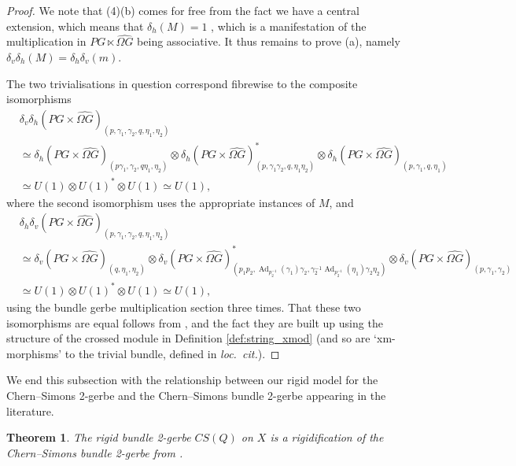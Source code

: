 \documentclass[12pt]{amsart}
\DeclareMathOperator{\Ad}{Ad}
\theoremstyle{plain}
\newtheorem{theorem}{Theorem}[section]
\theoremstyle{definition}
\theoremstyle{remark}
\numberwithin{equation}{section}
\newcommand{\<}{\langle}
\renewcommand{\>}{\rangle}
\begin{document}
\begin{proof}
We note that (4)(b) comes for free from the fact we have a central extension, which means that $\delta_h(M)=1$ \cite[\S 3]{MS03}, which is a manifestation of the multiplication in $PG\ltimes \widehat{\Omega G}$ being associative.
It thus remains to prove (a), namely $\delta_v\delta_h(M)=\delta_h\delta_v(m)$. 

The two trivialisations in question correspond fibrewise to the composite isomorphisms
  \begin{align*}
&\delta_v\delta_h(PG\times \widehat{\Omega G})_{(p,\gamma_1,\gamma_2,q,\eta_1,\eta_2)}\\ 
& \simeq \delta_h(PG\times \widehat{\Omega G})_{(p\gamma_1,\gamma_2,q\eta_1,\eta_2)}\otimes \delta_h(PG\times \widehat{\Omega G})^*_{(p,\gamma_1\gamma_2,q,\eta_1\eta_2)} \otimes \delta_h(PG\times \widehat{\Omega G})_{(p,\gamma_1,q,\eta_1)}  \\
&\simeq U(1)\otimes U(1)^*\otimes U(1)
 \simeq U(1),
\end{align*}
where the second isomorphism uses the appropriate instances of $M$, and
\begin{align*}
&\delta_h\delta_v(PG\times \widehat{\Omega G})_{(p,\gamma_1,\gamma_2,q,\eta_1,\eta_2)}\\
& \simeq \delta_v(PG\times \widehat{\Omega G})_{(q,\eta_1,\eta_2)} \otimes \delta_v(PG\times \widehat{\Omega G})^*_{(p_1p_2,\Ad_{p_2^{-1}}(\gamma_1)\gamma_2,\gamma_2^{-1}\Ad_{p_2^{-1}}(\eta_1)\gamma_2\eta_2)} \otimes \delta_v(PG\times \widehat{\Omega G})_{(p,\gamma_1,\gamma_2)} \\
& \simeq U(1)\otimes U(1)^*\otimes U(1) \simeq U(1),
\end{align*}
using the bundle gerbe multiplication section three times.
That these two isomorphisms are equal follows from \cite[Lemma 6.4]{MRSV}, and the fact they are built up using the structure of the crossed module in Definition \ref{def:string_xmod} (and so are `\textsf{xm}-morphisms' to the trivial bundle, defined in \emph{loc.\ cit.}).
\end{proof}


We end this subsection with the relationship between our rigid model for the Chern--Simons 2-gerbe and the Chern--Simons bundle 2-gerbe appearing in the literature. 



\begin{theorem}\label{prop:rigidification}
The rigid bundle 2-gerbe $CS(Q)$ on $X$ is a rigidification of the Chern--Simons bundle 2-gerbe from \cite{CJMSW}.
\end{theorem}
\end{document}
